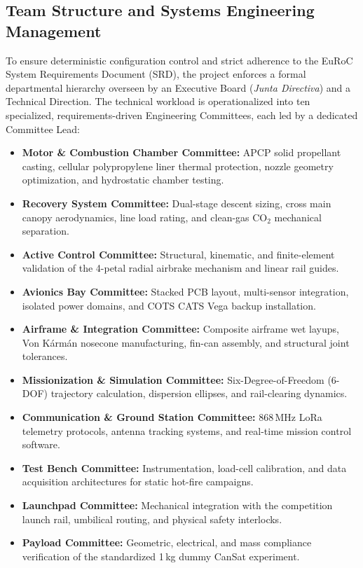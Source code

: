 \documentclass[11pt, a4paper]{article} %
\begin{document}
\subsection{Team Structure and Systems Engineering Management}
To ensure deterministic configuration control and strict adherence to the EuRoC System Requirements Document (SRD), the project enforces a formal departmental hierarchy overseen by an Executive Board (\textit{Junta Directiva}) and a Technical Direction. The technical workload is operationalized into ten specialized, requirements-driven Engineering Committees, each led by a dedicated Committee Lead:

\begin{itemize}
    \item \textbf{Motor \& Combustion Chamber Committee:} APCP solid propellant casting, cellular polypropylene liner thermal protection, nozzle geometry optimization, and hydrostatic chamber testing.
    \item \textbf{Recovery System Committee:} Dual-stage descent sizing, cross main canopy aerodynamics, line load rating, and clean-gas $\text{CO}_2$ mechanical separation.
    \item \textbf{Active Control Committee:} Structural, kinematic, and finite-element validation of the 4-petal radial airbrake mechanism and linear rail guides.
    \item \textbf{Avionics Bay Committee:} Stacked PCB layout, multi-sensor integration, isolated power domains, and COTS CATS Vega backup installation.
    \item \textbf{Airframe \& Integration Committee:} Composite airframe wet layups, Von Kármán nosecone manufacturing, fin-can assembly, and structural joint tolerances.
    \item \textbf{Missionization \& Simulation Committee:} Six-Degree-of-Freedom (6-DOF) trajectory calculation, dispersion ellipses, and rail-clearing dynamics.
    \item \textbf{Communication \& Ground Station Committee:} 868\,MHz LoRa telemetry protocols, antenna tracking systems, and real-time mission control software.
    \item \textbf{Test Bench Committee:} Instrumentation, load-cell calibration, and data acquisition architectures for static hot-fire campaigns.
    \item \textbf{Launchpad Committee:} Mechanical integration with the competition launch rail, umbilical routing, and physical safety interlocks.
    \item \textbf{Payload Committee:} Geometric, electrical, and mass compliance verification of the standardized 1\,kg dummy CanSat experiment.
\end{itemize}
\end{document}
